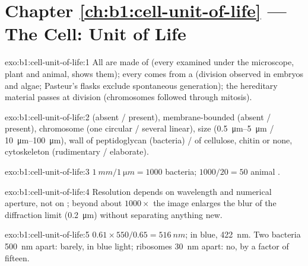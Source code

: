 \section*{Chapter \ref{ch:b1:cell-unit-of-life} --- The Cell: Unit of Life}

\begin{solution}{exo:b1:cell-unit-of-life:1}
All  are made of  (every  examined under the
microscope, plant and animal, shows them); every  comes from a 
(division observed in embryos and algae; Pasteur's flasks exclude
spontaneous generation); the hereditary material passes at division
(chromosomes followed through mitosis).
\end{solution}

\begin{solution}{exo:b1:cell-unit-of-life:2}
 (absent / present), membrane-bounded  (absent /
present), chromosome (one circular / several linear), size
(\qtyrange{0.5}{5}{\micro m} / \qtyrange{10}{100}{\micro m}),  wall
of peptidoglycan (bacteria) / of cellulose, chitin or none,
cytoskeleton (rudimentary / elaborate).
\end{solution}

\begin{solution}{exo:b1:cell-unit-of-life:3}
$\qty{1}{mm}/\qty{1}{\micro m} = 1000$ bacteria; $1000/20 = 50$ animal
.
\end{solution}

\begin{solution}{exo:b1:cell-unit-of-life:4}
Resolution depends on wavelength and numerical aperture, not on
; beyond about $1000\times$ the image enlarges the blur
of the diffraction limit (\qty{0.2}{\micro m}) without separating
anything new.
\end{solution}

\begin{solution}{exo:b1:cell-unit-of-life:5}
$0.61\times 550/0.65 = \qty{516}{nm}$; in blue, \qty{422}{nm}. Two
bacteria \qty{500}{nm} apart: barely, in blue light; ribosomes
\qty{30}{nm} apart: no, by a factor of fifteen.
\end{solution}

